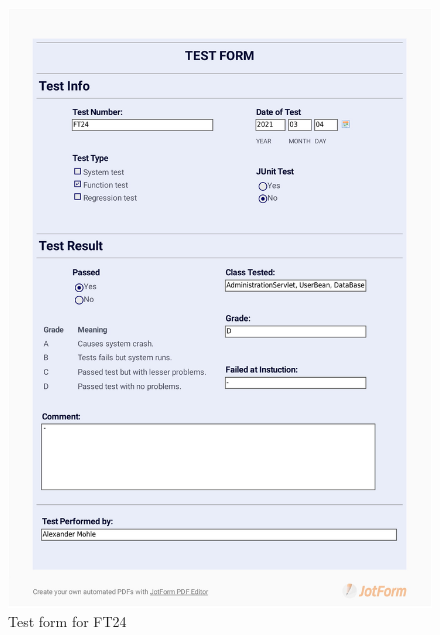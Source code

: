 \documentclass{article}
\begin{document}
 \begin{figure}
     \centering
     \includegraphics[width=13cm]{images/2021-03-04_Alexander_FT24-1}
     \renewcommand\figurename{Figure}
     \caption{Test form for FT24}
     \label{fig:my_label}
 \end{figure}
 
\end{document}
